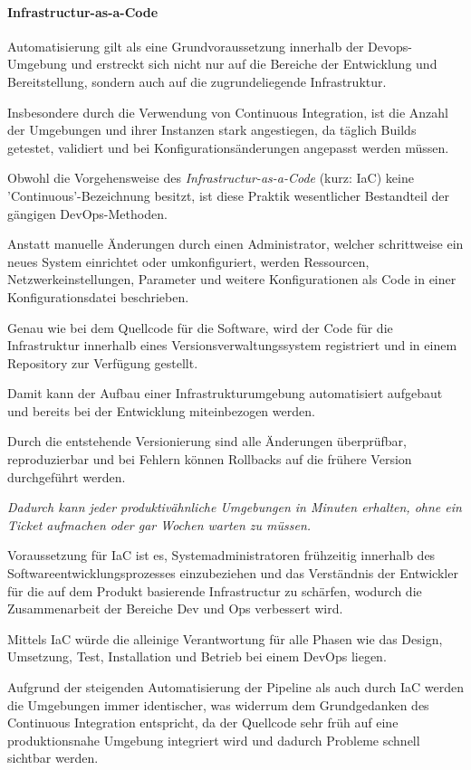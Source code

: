 \paragraph{Infrastructur-as-a-Code}

Automatisierung gilt als eine Grundvoraussetzung innerhalb der Devops-Umgebung und erstreckt sich nicht nur auf die Bereiche der Entwicklung und Bereitstellung, sondern auch auf die zugrundeliegende Infrastruktur. \cite[S. 272]{tiemeyer_handbuch_2021} 

Insbesondere durch die Verwendung von Continuous Integration, ist die Anzahl der Umgebungen und ihrer Instanzen stark angestiegen, da täglich Builds getestet, validiert und bei Konfigurationsänderungen angepasst werden müssen. \cite[S. 19]{sharma_devops_2017}

Obwohl die Vorgehensweise des \textit{Infrastructur-as-a-Code} (kurz: IaC) keine 'Continuous'-Bezeichnung besitzt, ist diese Praktik wesentlicher Bestandteil der gängigen DevOps-Methoden. \cite[S. 30]{alt_innovationsorientiertes_2017} 

Anstatt manuelle Änderungen durch einen Administrator, welcher schrittweise ein neues System einrichtet oder umkonfiguriert, werden Ressourcen, Netzwerkeinstellungen, Parameter und weitere Konfigurationen als Code in einer Konfigurationsdatei beschrieben. \cite{juner_praxisbasierte_2017} \cite{luber_was_2020}

Genau wie bei dem Quellcode für die Software, wird der Code für die Infrastruktur innerhalb eines Versionsverwaltungssystem registriert und in einem Repository zur Verfügung gestellt.

Damit kann der Aufbau einer Infrastrukturumgebung automatisiert aufgebaut und bereits bei der Entwicklung miteinbezogen werden.

Durch die entstehende Versionierung sind alle Änderungen überprüfbar, reproduzierbar und bei Fehlern können Rollbacks auf die frühere Version durchgeführt werden.\cite[S. 272]{tiemeyer_handbuch_2021}   

\textit{Dadurch kann jeder produktivähnliche Umgebungen in Minuten erhalten, ohne ein Ticket aufmachen oder gar Wochen warten zu müssen.} \cite[S. 107]{kim_devops-handbuch_2017}

Voraussetzung für IaC ist es, Systemadministratoren frühzeitig innerhalb des Softwareentwicklungsprozesses einzubeziehen und das Verständnis der Entwickler für die auf dem Produkt basierende Infrastructur zu schärfen, wodurch die Zusammenarbeit der Bereiche Dev und Ops verbessert wird. \cite[S. 30]{alt_innovationsorientiertes_2017}

Mittels IaC würde die alleinige Verantwortung für alle Phasen wie das Design, Umsetzung, Test, Installation und Betrieb bei einem DevOps liegen. \cite{kasteleiner_devops_2019}

Aufgrund der steigenden Automatisierung der Pipeline als auch durch IaC werden die Umgebungen immer identischer, was widerrum dem Grundgedanken des Continuous Integration entspricht, da der Quellcode sehr früh auf eine produktionsnahe Umgebung integriert wird und dadurch Probleme schnell sichtbar werden. \cite[S. 111 - 113]{kim_devops-handbuch_2017} 
